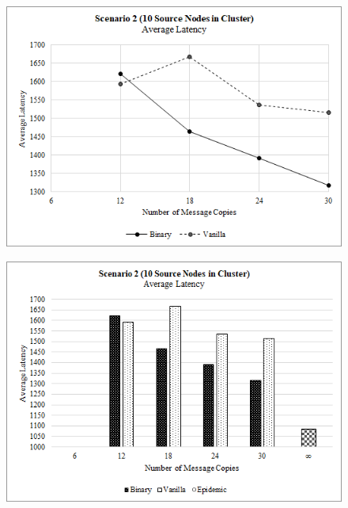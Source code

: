 \documentclass{article}
\begin{document}
\begin{figure}[h!]
\centering
\begin{minipage}[t]{.5\textwidth}
  \centering
  \includegraphics[width=.98\linewidth]{Results/Graphs/AverageLatency/S2_AverageLatency_SprayAndWaitComparison.png}
  \label{fig:test1}
\end{minipage}%
\begin{minipage}[t]{.5\textwidth}
  \centering
  \includegraphics[width=.98\linewidth]{Results/Graphs/AverageLatency/S2_AverageLatency_AllComparison.png}
  \label{fig:test2}
\end{minipage}


\end{figure}
\end{document}
